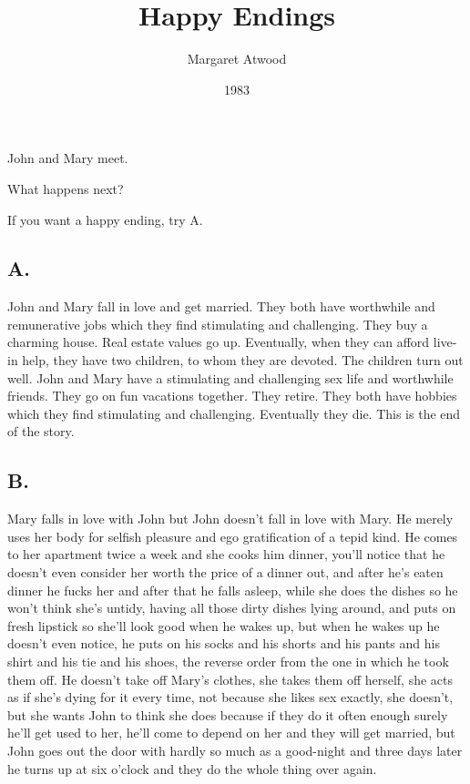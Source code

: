 \documentclass[10pt,a4paper]{article}
\begin{document}
\title{Happy Endings}
\date{1983}
\author{Margaret Atwood}
\maketitle
    
\thispagestyle{plain}
\setcounter{page}{1}
\linenumbers
\noindent John and Mary meet.

What happens next?

If you want a happy ending, try A. 

\subsection{A.}
John and Mary fall in love and get married. They both have worthwhile and remunerative jobs which they find stimulating and challenging. They buy a charming house. Real estate values go up. Eventually, when they can afford live-in help, they have two children, to whom they are devoted. The children turn out well. John and Mary have a stimulating and challenging sex life and worthwhile friends. They go on fun vacations together. They retire. They both have hobbies which they find stimulating and challenging. Eventually they die. This is the end of the story. 

\subsection{B.}
Mary falls in love with John but John doesn't fall in love with Mary. He merely uses her body for selfish pleasure and ego gratification of a tepid kind. He comes to her apartment twice a week and she cooks him dinner, you'll notice that he doesn't even consider her worth the price of a dinner out, and after he's eaten dinner he fucks her and after that he falls asleep, while she does the dishes so he won't think she's untidy, having all those dirty dishes lying around, and puts on fresh lipstick so she'll look good when he wakes up, but when he wakes up he doesn't even notice, he puts on his socks and his shorts and his pants and his shirt and his tie and his shoes, the reverse order from the one in which he took them off. He doesn't take off Mary's clothes, she takes them off herself, she acts as if she's dying for it every time, not because she likes sex exactly, she doesn't, but she wants John to think she does because if they do it often enough surely he'll get used to her, he'll come to depend on her and they will get married, but John goes out the door with hardly so much as a good-night and three days later he turns up at six o'clock and they do the whole thing over again.
\end{document}
